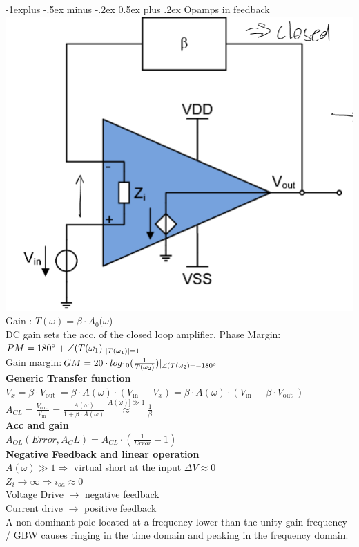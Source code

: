 \documentclass[5pt,landscape]{article}
\makeatletter
\renewcommand{\subsection}{\@startsection{subsection}{2}{0mm}%
                                {-1explus -.5ex minus -.2ex}%
                                {0.5ex plus .2ex}%
                                {\normalfont\normalsize\bfseries}}
\makeatother
\begin{document}
\begin{multicols*}{5}
\subsection{Opamps in feedback}
\includegraphics[width = \columnwidth]{images/opampfeedbacl.png}
Gain : $ T(\omega) =\beta \cdot A_0 (\omega $) \\
DC gain sets the acc. of the closed loop amplifier.
Phase Margin: $PM =180 \degree + \angle (T(\omega_1)|_{  |T(\omega_1)| = 1 } $\\
Gain margin:$ GM = 20 \cdot log_{10} (\frac{1}{T(\omega_2)})|_{\angle (T(\omega_2) = - 180 \degree  }$\\
\textbf{Generic Transfer function}\\
$  V_{x}=\beta \cdot V_{\text {out }}=\beta \cdot A(\omega) \cdot\left(V_{\text {in }}-V_{x}\right)=\beta \cdot A(\omega) \cdot\left(V_{\text {in }}-\beta \cdot V_{\text {out }}\right)$\\
$ A_{CL} =\frac{V_{\text {out }}}{V_{\text {in }}}=\frac{A(\omega)}{1+\beta \cdot A(\omega)} \stackrel{A(\omega)] \gg 1}{\approx} \frac{1}{\beta} $\\
\textbf{Acc and gain}\\
$ A_{OL}(Error, A_CL) = A_{CL} \cdot (\frac{1}{Error} -1)$\\
\textbf{Negative Feedback and linear operation}\\
$ A(\omega) \gg 1 \Rightarrow $ virtual short at the input $ \Delta V \approx 0  $ \\
$ Z_i \rightarrow \infty \Rightarrow i_{oa} \approx 0 $ \\
 Voltage Drive $ \rightarrow $ negative feedback\\
 Current drive $ \rightarrow $ positive feedback\\
 A non-dominant pole located at a frequency lower than the unity gain frequency / GBW causes ringing in the time domain and peaking in the frequency domain.

\end{multicols*}
\end{document}
